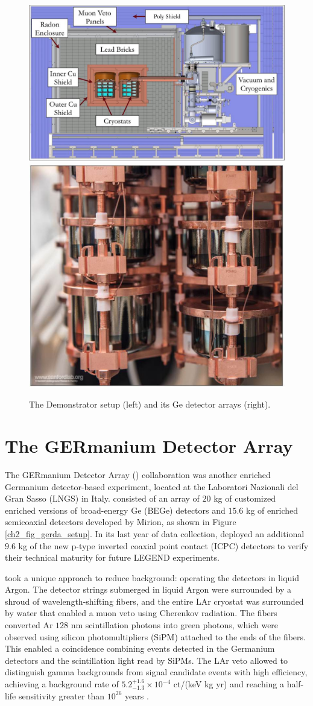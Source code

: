 \begin{figure}
  \centering
  \includegraphics[height=0.34\columnwidth]{ch2/figs/mjd_setup.pdf}
  \qquad
  \includegraphics[height=0.34\columnwidth]{ch2/figs/mjd_ppc_array.pdf}
  \caption{The {\MJ} Demonstrator setup (left) and its Ge detector arrays (right).}
    \label{fig:mjd}
  \end{figure}
 
\section{The GERmanium Detector Array}

The GERmanium Detector Array ({\Gerda}) collaboration was another enriched Germanium detector-based experiment, located at the Laboratori Nazionali del Gran Sasso (LNGS) in Italy. {\Gerda} consisted of an array of $20$ kg of customized enriched versions of broad-energy Ge (BEGe) detectors and $15.6$ kg of enriched semicoaxial detectors developed by Mirion, as shown in Figure \ref{ch2_fig_gerda_setup}. In its last year of data collection, {\Gerda} deployed an additional $9.6$ kg of the new p-type inverted coaxial point contact (ICPC) detectors to verify their technical maturity for future LEGEND experiments.

{\Gerda} took a unique approach to reduce background: operating the detectors in liquid Argon. The detector strings submerged in liquid Argon were surrounded by a shroud of wavelength-shifting fibers, and the entire LAr cryostat was surrounded by water that enabled a muon veto using Cherenkov radiation. The fibers converted Ar $128$ nm scintillation photons into green photons, which were observed using silicon photomultipliers (SiPM) attached to the ends of the fibers. This enabled a coincidence combining events detected in the Germanium detectors and the scintillation light read by SiPMs. The LAr veto allowed {\Gerda} to distinguish gamma backgrounds from {\onbb} signal candidate events with high efficiency, achieving a background rate of $5.2^{+1.6}_{-1.3}\times 10^{-4}$ ct/(keV kg yr) and reaching a half-life sensitivity greater than $10^{26}$ years \cite{GERDA_final}.

